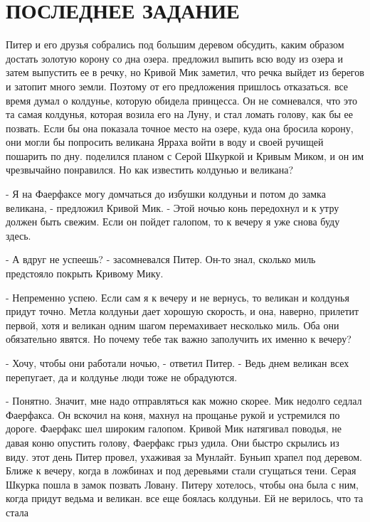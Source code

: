 \chapter{ПОСЛЕДНЕЕ ЗАДАНИЕ}
\par{} Питер и его друзья собрались под большим деревом обсудить, 
каким образом достать золотую корону со дна озера.
 предложил выпить всю воду из озера и затем выпустить ее в 
речку, но Кривой Мик заметил, что речка выйдет из берегов и затопит 
много земли. Поэтому от его предложения пришлось отказаться.
 все время думал о колдунье, которую обидела принцесса. Он не 
сомневался, что это та самая колдунья, которая возила его на Луну, и 
стал ломать голову, как бы ее позвать. Если бы она показала точное 
место на озере, куда она бросила корону, они могли бы попросить 
великана Ярраха войти в воду и своей ручищей пошарить по дну.
 поделился планом с Серой Шкуркой и Кривым Миком, и он им 
чрезвычайно понравился. Но как известить колдунью и великана?
\par- Я на Фаерфаксе могу домчаться до избушки колдуньи и потом до 
замка великана, - предложил Кривой Мик. - Этой ночью конь передохнул и 
к утру должен быть свежим. Если он пойдет галопом, то к вечеру я уже 
снова буду здесь.
\par- А вдруг не успеешь? - засомневался Питер. Он-то знал, сколько 
миль предстояло покрыть Кривому Мику.
\par- Непременно успею. Если сам я к вечеру и не вернусь, то великан и 
колдунья придут точно. Метла колдуньи дает хорошую скорость, и она, 
наверно, прилетит первой, хотя и великан одним шагом перемахивает 
несколько миль. Оба они обязательно явятся. Но почему тебе так важно 
заполучить их именно к вечеру?
\par- Хочу, чтобы они работали ночью, - ответил Питер. - Ведь днем 
великан всех перепугает, да и колдунье люди тоже не обрадуются.
\par- Понятно. Значит, мне надо отправляться как можно скорее.
 Мик недолго седлал Фаерфакса. Он вскочил на коня, махнул на 
прощанье рукой и устремился по дороге. Фаерфакс шел широким галопом. 
Кривой Мик натягивал поводья, не давая коню опустить голову, Фаерфакс 
грыз удила. Они быстро скрылись из виду.
 этот день Питер провел, ухаживая за Мунлайт. Буньип храпел 
под деревом. Ближе к вечеру, когда в ложбинах и под деревьями стали 
сгущаться тени. Серая Шкурка пошла в замок позвать Ловану. Питеру 
хотелось, чтобы она была с ним, когда придут ведьма и великан.
 все еще боялась колдуньи. Ей не верилось, что та стала 
